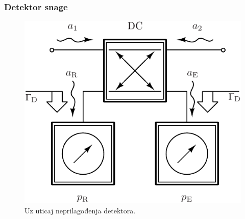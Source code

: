 \documentclass[a4paper, 12pt, diplomski]{etf}
\begin{document}
\subsubsection{Detektor snage \label{ss:detektor}}
%
%
\begin{figure}[t!]
    \centering
    \includegraphics{fig/umatch_rfd.pdf}
    \caption{Uz uticaj neprilagođenja detektora.}
    \label{fig:umatch_rfd}
\end{figure}
%
\end{document}

